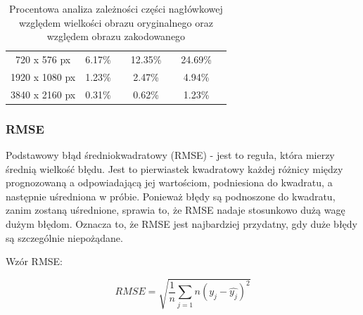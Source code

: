 \documentclass{article}
\begin{document}
\begin{table}[!h]
\begin{tabular}{cclclcl}
720 x 576 px                                                                      & 6.17\%   &                                                                                & 12.35\%  &                                                                                & 24.69\%  &                                                                                 \\
1920 x 1080 px                                                                    & 1.23\%   &                                                                                & 2.47\%   &                                                                                & 4.94\%   &                                                                                 \\
3840 x 2160 px                                                                    & 0.31\%   &                                                                                & 0.62\%   &                                                                                & 1.23\%   &                                                                                 \\
\bottomrule
\end{tabular}
\caption{\label{tab:Procentowa analiza zależności części nagłówkowej względem wielkości obrazu oryginalnego oraz względem obrazu zakodowanego}Procentowa analiza zależności części nagłówkowej względem wielkości obrazu oryginalnego oraz względem obrazu zakodowanego}
\end{table}

\subsubsection{RMSE}

Podstawowy błąd średniokwadratowy (RMSE) - jest to reguła, która mierzy średnią wielkość błędu. Jest to pierwiastek kwadratowy każdej różnicy między prognozowaną a odpowiadającą jej wartościom, podniesiona do kwadratu, a następnie uśredniona w próbie. Ponieważ błędy są podnoszone do kwadratu, zanim zostaną uśrednione, sprawia to, że RMSE nadaje stosunkowo dużą wagę dużym błędom. Oznacza to, że RMSE jest najbardziej przydatny, gdy duże błędy są szczególnie niepożądane.

Wzór RMSE:

\begin{equation}
RMSE = \sqrt{\frac{1}{n} \sum_{j=1}{n} (y_{j} - \hat{y_{j}} )^2}
\end{equation}
\end{document}
